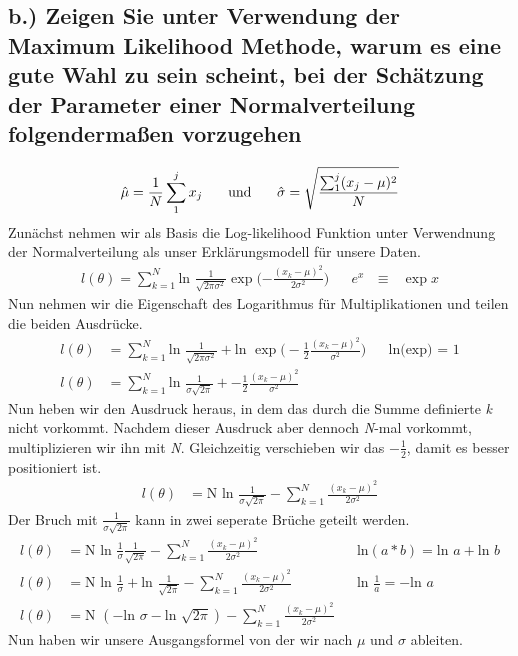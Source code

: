 \subsection*{b.) Zeigen Sie unter Verwendung der Maximum Likelihood Methode, warum es eine gute Wahl zu sein scheint, bei der Schätzung der Parameter einer Normalverteilung folgendermaßen \newline vorzugehen}
\begin{align*}
	\hat\mu = \frac{1}{N}\sum_1^jx_j
	\indent\text{ und }\indent
	\hat\sigma = \sqrt{\frac{\sum_1^j(x_j-\mu)^2}{N}}
\end{align*}
Zunächst nehmen wir als Basis die Log-likelihood Funktion unter Verwendnung der Normalverteilung als unser Erklärungsmodell für unsere Daten.
\begin{align*}
	l(\theta) = \sum_{k=1}^N \text{ln }\frac{1}{\sqrt{2\pi\sigma^2}}\exp\bigg({-\frac{(x_k-\mu)^2}{2\sigma^2}}\bigg) && \text{$e^{x}$ $\equiv$ $\exp{x}$}
\end{align*}
Nun nehmen wir die Eigenschaft des Logarithmus für Multiplikationen und teilen die beiden Ausdrücke.
\begin{align*}
	l(\theta) &= \sum_{k=1}^N \text{ln }\frac{1}{\sqrt{2\pi\sigma^2}} + \text{ln }\exp\bigg(-\frac{1}{2}{\frac{(x_k-\mu)^2}{\sigma^2}}\bigg) && \text{ln(exp) = 1} \\
	l(\theta) &= \sum_{k=1}^N \text{ln }\frac{1}{\sigma\sqrt{2\pi}} + -\frac{1}{2}{\frac{(x_k-\mu)^2}{\sigma^2}}
\end{align*}
Nun heben wir den Ausdruck heraus, in dem das durch die Summe definierte \textit{k} nicht vorkommt. Nachdem dieser Ausdruck aber dennoch \textit{N}-mal vorkommt, multiplizieren wir ihn mit \textit{N}.
Gleichzeitig verschieben wir das $-\frac{1}{2}$, damit es besser positioniert ist.
\begin{align*}
	l(\theta) &= \text{N }\text{ln }\frac{1}{\sigma\sqrt{2\pi}} - \sum_{k=1}^N {\frac{(x_k-\mu)^2}{2\sigma^2}}
\end{align*}
Der Bruch mit $\frac{1}{\sigma\sqrt{2\pi}}$ kann in zwei seperate Brüche geteilt werden.
\begin{align*}
	l(\theta) &= \text{N }\text{ln }\frac{1}{\sigma}\frac{1}{\sqrt{2\pi}} - \sum_{k=1}^N {\frac{(x_k-\mu)^2}{2\sigma^2}} && \text{ln}(a*b) = \text{ln } a + \text{ln } b \\
	l(\theta) &= \text{N }\text{ln }\frac{1}{\sigma}+\text{ln }\frac{1}{\sqrt{2\pi}} - \sum_{k=1}^N {\frac{(x_k-\mu)^2}{2\sigma^2}} && \text{ln } \frac{1}{a} = - \text{ln }a \\
	l(\theta) &= \text{N } (- \text{ln }\sigma - \text{ln }\sqrt{2\pi}) - \sum_{k=1}^N {\frac{(x_k-\mu)^2}{2\sigma^2}}
\end{align*}
Nun haben wir unsere Ausgangsformel von der wir nach $\mu$ und $\sigma$ ableiten.


